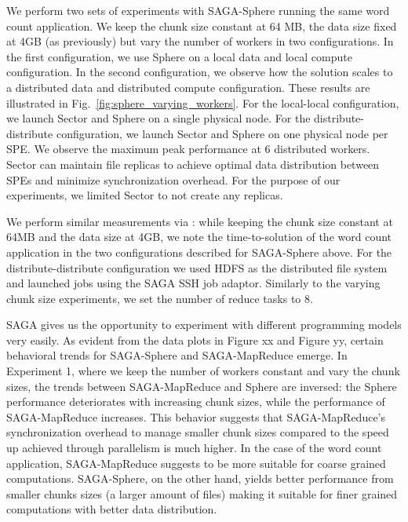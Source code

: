 \documentclass[3p,twocolumn]{elsarticle}
\begin{document}
We perform two sets of experiments with SAGA-Sphere running the same
word count application.  We keep the chunk size constant at 64 MB, the
data size fixed at 4GB (as previously) but vary the number of workers
in two configurations. In the first configuration, we use Sphere on a
local data and local compute configuration. In the second
configuration, we observe how the solution scales to a distributed
data and distributed compute configuration. These results are
illustrated in Fig.~\ref{fig:sphere_varying_workers}.  For the local-local
configuration, we launch Sector and Sphere on a single physical node.
For the distribute-distribute configuration, we launch Sector and
Sphere on one physical node per SPE.  We observe the maximum peak
performance at 6 distributed workers. Sector can maintain file
replicas to achieve optimal data distribution between SPEs and
minimize synchronization overhead. For the purpose of our experiments,
we limited Sector to not create any replicas.

We perform similar measurements via \sagamapreduce: while keeping the
chunk size constant at 64MB and the data size at 4GB, we note the
time-to-solution of the word count application in the two
configurations described for SAGA-Sphere above.  For the
distribute-distribute configuration we used HDFS as the distributed
file system and launched jobs using the SAGA SSH job adaptor.
Similarly to the varying chunk size experiments, we set the number of
reduce tasks to 8.  

SAGA gives us the opportunity to experiment with different programming models very easily. 
As evident from the data plots in Figure xx and Figure yy, certain behavioral 
trends for SAGA-Sphere and SAGA-MapReduce emerge.  In Experiment 1, where we keep the 
number of workers constant and vary the chunk sizes, the trends between 
SAGA-MapReduce and Sphere are inversed: the Sphere performance deteriorates with 
increasing chunk sizes, while the performance of SAGA-MapReduce increases. This behavior
suggests that SAGA-MapReduce's synchronization overhead to manage smaller 
chunk sizes compared to the speed up achieved through parallelism is much higher. 
In the case of the word count application, SAGA-MapReduce suggests to be more 
suitable for coarse grained computations. SAGA-Sphere, on the other hand, yields 
better performance from smaller chunks sizes (a larger amount of files) making it 
suitable for finer grained computations with better data distribution.
\end{document}

